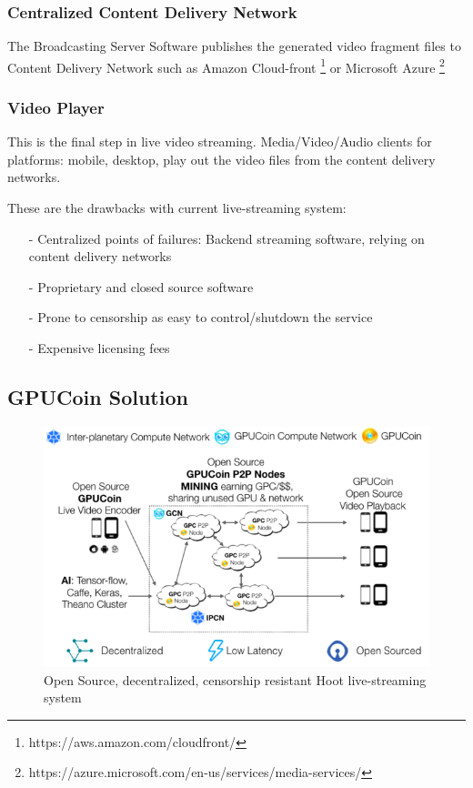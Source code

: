 \documentclass{article}
\begin{document}
\subsubsection{Centralized Content Delivery Network}
The Broadcasting Server Software publishes the generated video fragment files to Content Delivery Network such as Amazon Cloud-front \footnote{https://aws.amazon.com/cloudfront/} or Microsoft Azure \footnote{https://azure.microsoft.com/en-us/services/media-services/}

\subsubsection{Video Player}
This is the final step in live video streaming. Media/Video/Audio clients for platforms: mobile, desktop, play out the video files from the content delivery networks.


These are the drawbacks with current live-streaming system:
\begin{itemize}
 \item[-]Centralized points of failures: Backend streaming software, relying on content delivery networks
 \item[-]Proprietary and closed source software
 \item[-]Prone to censorship as easy to control/shutdown the service
 \item[-]Expensive licensing fees
\end{itemize}

\subsection{GPUCoin Solution}

\begin{figure}[h!]
 \centering
 \includegraphics[width=1.0\textwidth]{static/gpucoin-solution-trans-ai}
 \caption{Open Source, decentralized, censorship resistant Hoot live-streaming system}
 \label{image:gpucoin-solution-trans-ai}
\end{figure}
\end{document}

